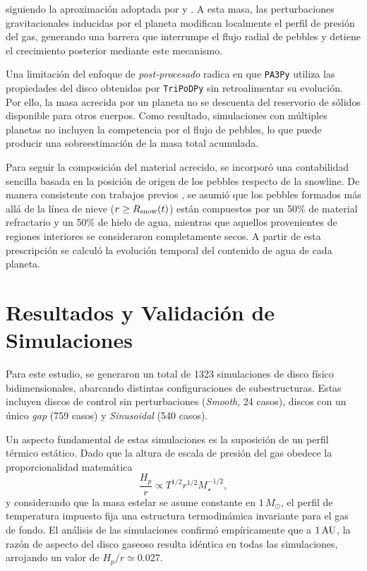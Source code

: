 siguiendo la aproximación adoptada por \citet{Lambrechts2014} y \citet{Drazkowska2023}. A esta masa, las perturbaciones gravitacionales inducidas por el planeta modifican localmente el perfil de presión del gas, generando una barrera que interrumpe el flujo radial de pebbles y detiene el crecimiento posterior mediante este mecanismo.


Una limitación del enfoque de \textit{post-procesado} radica en que \texttt{PA3Py} utiliza las propiedades del disco obtenidas por \texttt{TriPoDPy} sin retroalimentar su evolución. Por ello, la masa acrecida por un planeta no se descuenta del reservorio de sólidos disponible para otros cuerpos. Como resultado, simulaciones con múltiples planetas no incluyen la competencia por el flujo de pebbles, lo que puede producir una sobreestimación de la masa total acumulada.


Para seguir la composición del material acrecido, se incorporó una contabilidad sencilla basada en la posición de origen de los pebbles respecto de la snowline. De manera consistente con trabajos previos \citep{Bitsch2021,McCloat2025}, se asumió que los pebbles formados más allá de la línea de nieve ($r \geq R_{\rm snow}(t)$) están compuestos por un 50\% de material refractario y un 50\% de hielo de agua, mientras que aquellos provenientes de regiones interiores se consideraron completamente secos. A partir de esta prescripción se calculó la evolución temporal del contenido de agua de cada planeta.


\section{Resultados y Validación de Simulaciones}


Para este estudio, se generaron un total de 1323 simulaciones de disco físico bidimensionales, abarcando distintas configuraciones de subestructuras. Estas incluyen discos de control sin perturbaciones (\textit{Smooth}, 24 casos), discos con un único \textit{gap} (759 casos) y \textit{Sinusoidal} (540 casos).

Un aspecto fundamental de estas simulaciones es la suposición de un perfil térmico estático. Dado que la altura de escala de presión del gas obedece la proporcionalidad matemática
\begin{equation}
\frac{H_p}{r} \propto T^{1/2} r^{1/2} M_\star^{-1/2},
\end{equation}
y considerando que la masa estelar se asume constante en $1\,M_\odot$, el perfil de temperatura impuesto fija una estructura termodinámica invariante para el gas de fondo. El análisis de las simulaciones confirmó empíricamente que a $1\,{\rm AU}$, la razón de aspecto del disco gaseoso resulta idéntica en todas las simulaciones, arrojando un valor de $H_p/r \simeq 0.027$. 

